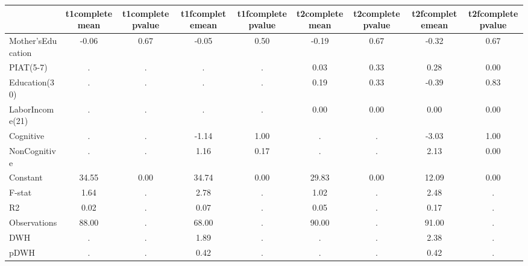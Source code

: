 \begin{table}[htbp]
\begin{tabular}{lcccccccc} \hline \hline
 & t1completemean  & t1completepvalue  & t1fcompletemean  & t1fcompletepvalue  & t2completemean  & t2completepvalue  & t2fcompletemean  & t2fcompletepvalue  \\  \hline 
Mother'sEducation &        -0.06 &         0.67 &        -0.05 &         0.50 &        -0.19 &         0.67 &        -0.32 &         0.67 \\  
PIAT(5-7) &            . &            . &            . &            . &         0.03 &         0.33 &         0.28 &         0.00 \\  
Education(30) &            . &            . &            . &            . &         0.19 &         0.33 &        -0.39 &         0.83 \\  
LaborIncome(21) &            . &            . &            . &            . &         0.00 &         0.00 &         0.00 &         0.00 \\  
Cognitive &            . &            . &        -1.14 &         1.00 &            . &            . &        -3.03 &         1.00 \\  
NonCognitive &            . &            . &         1.16 &         0.17 &            . &            . &         2.13 &         0.00 \\  
Constant &        34.55 &         0.00 &        34.74 &         0.00 &        29.83 &         0.00 &        12.09 &         0.00 \\  
F-stat &         1.64 &            . &         2.78 &            . &         1.02 &            . &         2.48 &            . \\  
R2 &         0.02 &            . &         0.07 &            . &         0.05 &            . &         0.17 &            . \\  
Observations &        88.00 &            . &        68.00 &            . &        90.00 &            . &        91.00 &            . \\  
DWH &            . &            . &         1.89 &            . &            . &            . &         2.38 &            . \\  
pDWH &            . &            . &         0.42 &            . &            . &            . &         0.42 &            . \\  
\hline \hline \end{tabular}
\end{table}
